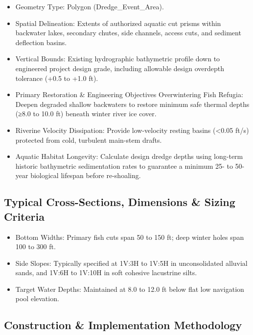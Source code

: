 \documentclass[
  letterpaper,
  DIV=11,
  numbers=noendperiod]{scrreprt}
\begin{document}
\begin{itemize}
\item
  Geometry Type: Polygon (Dredge\_Event\_Area).
\item
  Spatial Delineation: Extents of authorized aquatic cut prisms within
  backwater lakes, secondary chutes, side channels, access cuts, and
  sediment deflection basins.
\item
  Vertical Bounds: Existing hydrographic bathymetric profile down to
  engineered project design grade, including allowable design overdepth
  tolerance (+0.5 to +1.0 ft).
\item
  Primary Restoration \& Engineering Objectives Overwintering Fish
  Refugia: Deepen degraded shallow backwaters to restore minimum safe
  thermal depths (≥8.0 to 10.0 ft) beneath winter river ice cover.
\item
  Riverine Velocity Dissipation: Provide low-velocity resting basins
  (\textless0.05 ft/s) protected from cold, turbulent main-stem drafts.
\item
  Aquatic Habitat Longevity: Calculate design dredge depths using
  long-term historic bathymetric sedimentation rates to guarantee a
  minimum 25- to 50-year biological lifespan before re-shoaling.
\end{itemize}

\subsection{Typical Cross-Sections, Dimensions \& Sizing
Criteria}\label{typical-cross-sections-dimensions-sizing-criteria}

\begin{itemize}
\item
  Bottom Widths: Primary fish cuts span 50 to 150 ft; deep winter holes
  span 100 to 300 ft.
\item
  Side Slopes: Typically specified at 1V:3H to 1V:5H in unconsolidated
  alluvial sands, and 1V:6H to 1V:10H in soft cohesive lacustrine silts.
\item
  Target Water Depths: Maintained at 8.0 to 12.0 ft below flat low
  navigation pool elevation.
\end{itemize}

\subsection{Construction \& Implementation
Methodology}\label{construction-implementation-methodology}
\end{document}
